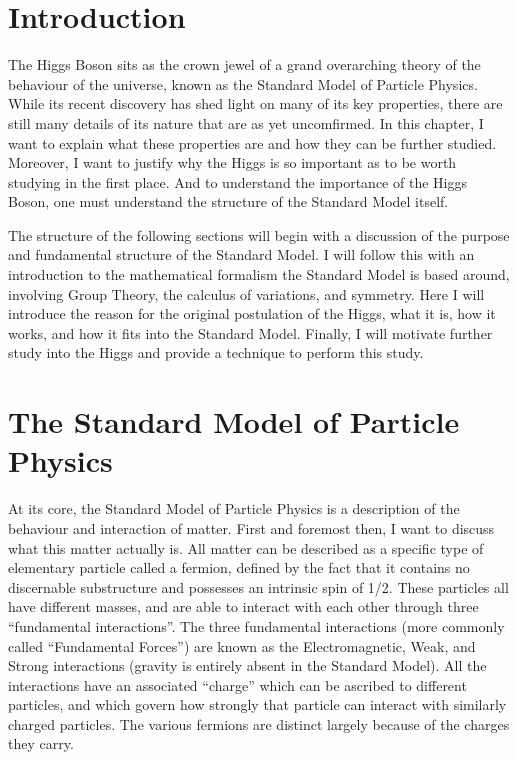 \section{Introduction}

    The Higgs Boson sits as the crown jewel of a grand overarching theory of the behaviour of the universe,
        known as the Standard Model of Particle Physics.
    While its recent discovery has shed light on many of its key properties,
        there are still many details of its nature that are as yet uncomfirmed.
    In this chapter, I want to explain what these properties are and how they can be further studied.
    Moreover, I want to justify why the Higgs is so important as to be worth studying in the first place.
    And to understand the importance of the Higgs Boson, one must understand the structure of the Standard Model itself.

    The structure of the following sections will begin with a discussion of the purpose and fundamental structure of the Standard Model.
    I will follow this with an introduction to the mathematical formalism the Standard Model is based around,
        involving Group Theory, the calculus of variations, and symmetry.
    Here I will introduce the reason for the original postulation of the Higgs, what it is, how it works, and how it fits into the Standard Model.
    Finally, I will motivate further study into the Higgs and provide a technique to perform this study.


\section{The Standard Model of Particle Physics}\label{sec:standard_model}
    
    At its core, the Standard Model of Particle Physics is a description of the behaviour and interaction of matter.
    First and foremost then, I want to discuss what this matter actually is.
    All matter can be described as a specific type of elementary particle called a fermion,
        defined by the fact that it contains no discernable substructure and possesses an intrinsic spin of 1/2.
    These particles all have different masses, and are able to interact with each other through three ``fundamental interactions''.
    The three fundamental interactions (more commonly called ``Fundamental Forces'') are known as
        the Electromagnetic, Weak, and Strong interactions (gravity is entirely absent in the Standard Model).
    All the interactions have an associated ``charge'' which can be ascribed to different particles,
        and which govern how strongly that particle can interact with similarly charged particles.
    The various fermions are distinct largely because of the charges they carry.

